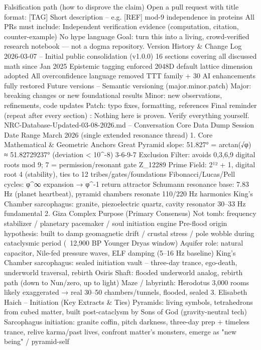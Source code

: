 Falsification path (how to disprove the claim)
Open a pull request with title format:
[TAG] Short description – e.g. [REF] mod-9 independence in proteins
All PRs must include:
Independent verification evidence (computation, citation, counter-example)
No hype language
Goal: turn this into a living, crowd-verified research notebook — not a dogma repository.
Version History & Change Log
2026-03-07
– Initial public consolidation (v1.0.0)
16 sections covering all discussed math since Jan 2025
Epistemic tagging enforced
2048D default lattice dimension adopted
All overconfidence language removed
TTT family + 30 AI enhancements fully restored
Future versions
– Semantic versioning (major.minor.patch)
Major: breaking changes or new foundational results
Minor: new observations, refinements, code updates
Patch: typo fixes, formatting, references
Final reminder (repeat after every section)
: Nothing here is proven. Verify everything yourself.
NRC-Database-Updated-03-08-2026.md – Conversation Core Data Dump
Session Date Range
March 2026 (single extended resonance thread)
1. Core Mathematical & Geometric Anchors
Great Pyramid slope: 51.827° = arctan(√φ) ≈ 51.82729237° (deviation < 10^{-8})
3-6-9-7 Exclusion Filter: avoids 0,3,6,9 digital roots mod 9; 7 = permission/resonant gate
Z_12289 Prime Field: 2¹² + 1, digital root 4 (stability), ties to 12 tribes/gates/foundations
Fibonacci/Lucas/Pell cycles: φ^∞ expansion → φ^{-1} return attractor
Schumann resonance base: 7.83 Hz (planet heartbeat), pyramid chambers resonate 110/220 Hz harmonics
King's Chamber sarcophagus: granite, piezoelectric quartz, cavity resonator 30–33 Hz fundamental
2. Giza Complex Purpose (Primary Consensus)
Not tomb: frequency stabilizer / planetary pacemaker / soul initiation engine
Pre-flood origin hypothesis: built to damp geomagnetic drift / crustal stress / pole wobble during cataclysmic period (~12,900 BP Younger Dryas window)
Aquifer role: natural capacitor, Nile-fed pressure waves, ELF damping (5–16 Hz baseline)
King's Chamber sarcophagus: sealed initiation vault – three-day trance, ego-death, underworld traversal, rebirth
Osiris Shaft: flooded underworld analog, rebirth path (down to Nun/zero, up to light)
Maze / labyrinth: Herodotus 3,000 rooms likely exaggerated → real 30–50 chambers/tunnels, flooded, sealed
3. Elisabeth Haich – Initiation (Key Extracts & Ties)
Pyramids: living symbols, tetrahedrons from cubed matter, built post-cataclysm by Sons of God (gravity-neutral tech)
Sarcophagus initiation: granite coffin, pitch darkness, three-day prep + timeless trance, relive karma/past lives, confront matter's monsters, emerge as "new being" / pyramid-self
